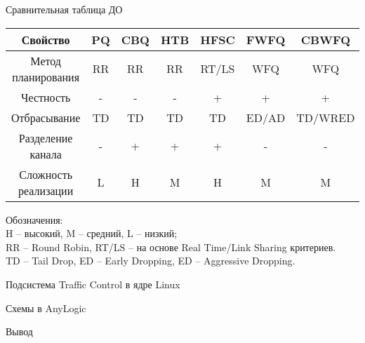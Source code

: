 \documentclass[12pt]{beamer}
\begin{document}
\newcommand{\mc}[0]{\makecell}
\begin{frame}{Сравнительная таблица ДО}
{\footnotesize
    \begin{tabular}{|c|c|c|c|c|c|c|}
        \hline
               Свойство     & PQ   & CBQ   & HTB   & HFSC  & FWFQ  & CBWFQ \\ \hline
\mc{Метод\\ планирования}   & RR   & RR    & RR    & RT/LS & WFQ   & WFQ   \\ \hline
Честность                   & -    & -     & -     & +     &  +    &  +    \\ \hline
     Отбрасывание           & TD   & TD    & TD    & TD    & ED/AD & TD/WRED \\ \hline
\mc{Разделение\\ канала}    & -    &  +    &  +    &  +    &  -    &  -    \\ \hline
\mc{Сложность \\ реализации}& L    & H     &  M    &  H    &   M   &  M\\ \hline
    \end{tabular}
}

{\scriptsize
	Обозначения:\\
	 H -- высокий, M -- средний, L -- низкий; \\
	 RR -- Round Robin, RT/LS -- на основе Real Time/Link Sharing критериев.\\
	 TD -- Tail Drop, ED -- Early Dropping, ED -- Aggressive Dropping.
}
\end{frame}

\begin{frame}{Подсистема Traffic Control в ядре Linux}
\end{frame}

\begin{frame}{Схемы в AnyLogic}
\end{frame}

\begin{frame}{Вывод}
\end{frame}


\itmothankyou
\end{document}

